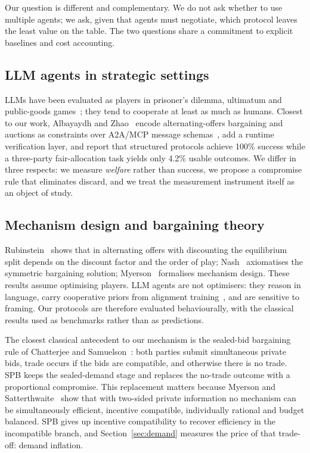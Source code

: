 \documentclass[11pt]{article}
\begin{document}
Our question is different and complementary. We do not ask whether to use multiple agents; we ask, given that agents must negotiate, which protocol leaves the least value on the table. The two questions share a commitment to explicit baselines and cost accounting.

\subsection{LLM agents in strategic settings}

LLMs have been evaluated as players in prisoner's dilemma, ultimatum and public-goods games~\cite{llm_cooperate,gamebench}; they tend to cooperate at least as much as humans. Closest to our work, Albayaydh and Zhao~\cite{mechanism2026} encode alternating-offers bargaining and auctions as constraints over A2A/MCP message schemas~\cite{a2a}, add a runtime verification layer, and report that structured protocols achieve 100\% success while a three-party fair-allocation task yields only 4.2\% usable outcomes. We differ in three respects: we measure \emph{welfare} rather than success, we propose a compromise rule that eliminates discard, and we treat the measurement instrument itself as an object of study.

\subsection{Mechanism design and bargaining theory}

Rubinstein~\cite{rubinstein1982} shows that in alternating offers with discounting the equilibrium split depends on the discount factor and the order of play; Nash~\cite{nash1950} axiomatises the symmetric bargaining solution; Myerson~\cite{myerson1991} formalises mechanism design. These results assume optimising players. LLM agents are not optimisers: they reason in language, carry cooperative priors from alignment training~\cite{llm_cooperate}, and are sensitive to framing. Our protocols are therefore evaluated behaviourally, with the classical results used as benchmarks rather than as predictions.

The closest classical antecedent to our mechanism is the sealed-bid bargaining rule of Chatterjee and Samuelson~\cite{chatterjee1983}: both parties submit simultaneous private bids, trade occurs if the bids are compatible, and otherwise there is no trade. SPB keeps the sealed-demand stage and replaces the no-trade outcome with a proportional compromise. This replacement matters because Myerson and Satterthwaite~\cite{myerson1983} show that with two-sided private information no mechanism can be simultaneously efficient, incentive compatible, individually rational and budget balanced. SPB gives up incentive compatibility to recover efficiency in the incompatible branch, and Section~\ref{sec:demand} measures the price of that trade-off: demand inflation.
\end{document}

